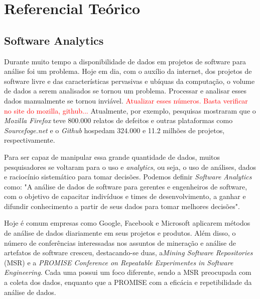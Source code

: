 \chapter{Referencial Teórico}
\label{ref}
\section{Software Analytics}
\label{ref:sof}
Durante muito tempo a disponibilidade de dados em projetos de software para análise foi um problema. Hoje em dia, com o auxílio da internet, dos projetos de software livre e das características pervasivas e ubíquas da computação, o volume de dados a serem analisados se tornou um problema. Processar e analisar esses dados manualmente se tornou inviável\cite{artAndScience}. \textcolor{red}{Atualizar esses números. Basta verificar no site do mozilla, github... } Atualmente, por exemplo, pesquisas mostraram que o \textit{Mozilla Firefox} teve 800.000 relatos de defeitos e outras plataformas como \textit{Sourcefoge.net} e o \textit{Github} hospedam 324.000 e 11.2 milhões de projetos, respectivamente\cite{informationNeeds}.

Para ser capaz de manipular essa grande quantidade de dados, muitos pesquisadores se voltaram para o uso e \textit{analytics}, ou seja, o uso de análises, dados e raciocínio sistemático para tomar decisões. Podemos definir \textit{Software Analytics} como: "A análise de dados de software para gerentes e engenheiros de software, com o objetivo de capacitar indivíduos e times de desenvolvimento, a ganhar e difundir conhecimento a partir de seus dados para tomar melhores decisões"\cite{informationNeeds}.


Hoje é comum empresas como Google, Facebook e Microsoft aplicarem métodos de análise de dados diariamente em seus projetos e produtos. Além disso, o número de conferências interessadas nos assuntos de mineração e análise de artefatos de software cresceu, destacando-se duas, a\textit{Mining Software Repositories} (MSR) e a \textit{PROMISE Conference on Repeatable Experimentes in Software Engineering}. Cada uma possui um foco diferente, sendo a MSR preocupada com a coleta dos dados, enquanto que a PROMISE com a eficácia e repetibilidade da análise de dados.

